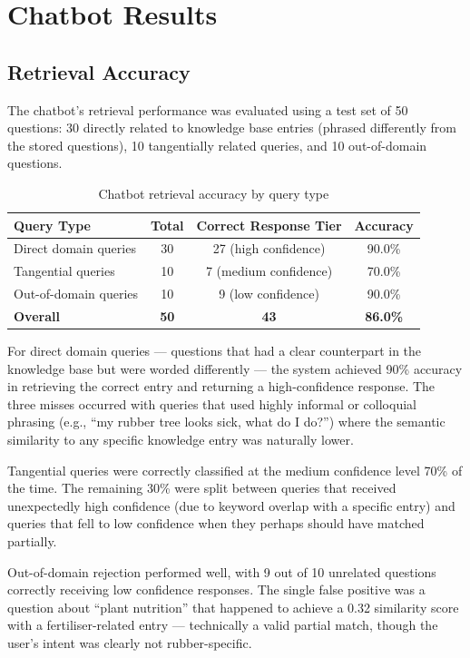 \section{Chatbot Results}

\subsection{Retrieval Accuracy}

The chatbot's retrieval performance was evaluated using a test set of 50 questions: 30 directly related to knowledge base entries (phrased differently from the stored questions), 10 tangentially related queries, and 10 out-of-domain questions.

\begin{table}[H]
\centering
\caption{Chatbot retrieval accuracy by query type}
\label{tab:chatbot_accuracy}
\begin{tabular}{|l|c|c|c|}
\hline
\textbf{Query Type} & \textbf{Total} & \textbf{Correct Response Tier} & \textbf{Accuracy} \\
\hline
Direct domain queries & 30 & 27 (high confidence) & 90.0\% \\
\hline
Tangential queries & 10 & 7 (medium confidence) & 70.0\% \\
\hline
Out-of-domain queries & 10 & 9 (low confidence) & 90.0\% \\
\hline
\textbf{Overall} & \textbf{50} & \textbf{43} & \textbf{86.0\%} \\
\hline
\end{tabular}
\end{table}

For direct domain queries --- questions that had a clear counterpart in the knowledge base but were worded differently --- the system achieved 90\% accuracy in retrieving the correct entry and returning a high-confidence response. The three misses occurred with queries that used highly informal or colloquial phrasing (e.g., ``my rubber tree looks sick, what do I do?'') where the semantic similarity to any specific knowledge entry was naturally lower.

Tangential queries were correctly classified at the medium confidence level 70\% of the time. The remaining 30\% were split between queries that received unexpectedly high confidence (due to keyword overlap with a specific entry) and queries that fell to low confidence when they perhaps should have matched partially.

Out-of-domain rejection performed well, with 9 out of 10 unrelated questions correctly receiving low confidence responses. The single false positive was a question about ``plant nutrition'' that happened to achieve a 0.32 similarity score with a fertiliser-related entry --- technically a valid partial match, though the user's intent was clearly not rubber-specific.

